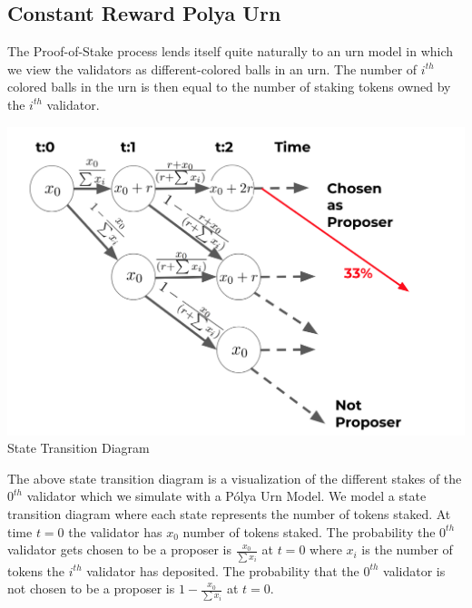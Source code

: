 \documentclass{article}
\renewcommand{\|}{\;|\;}
\begin{document}
\subsection{Constant Reward Polya Urn}
The Proof-of-Stake process lends itself quite naturally to an urn model in which we view the validators as different-colored balls in an urn. The number of $i^{th}$ colored balls in the urn is then equal to the number of staking tokens owned by the $i^{th}$ validator.
\begin{center}
\includegraphics[scale=0.4]{Markov.png}
\newline State Transition Diagram
\end{center}
The above state transition diagram is a visualization of the different stakes of the $0^{th}$ validator which we simulate with a P\'olya Urn Model. We model a state transition diagram where each state represents the number of tokens staked. At time $t = 0$ the validator has $x_0$ number of tokens staked. The probability the $0^{th}$ validator gets chosen to be a proposer is $\frac{x_0}{\sum x_i}$ at $t = 0$ where $x_i$ is the number of tokens the $i^{th}$ validator has deposited. The probability that the $0^{th}$ validator is not chosen to be a proposer is $1 - \frac{x_0}{\sum x_i}$ at $t = 0$. 
\end{document}

